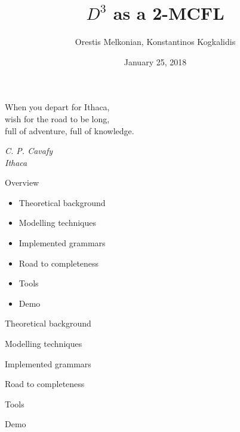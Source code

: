 \documentclass{beamer}
\title{$D^3$ as a 2-MCFL}
\subtitle{}
\author{Orestis Melkonian, Konstantinos Kogkalidis}
\date{January 25, 2018}
\institute{Universiteit Utrecht}
\begin{document}
	\maketitle	
	\begin{frame}{}
		\epigraph
			{When you depart for Ithaca,\\wish for the road to be long,\\full of adventure, full of knowledge.}
			{\textit{C. P. Cavafy\\ Ithaca}}
	\end{frame}
	
	\begin{frame}{Overview}
    \begin{itemize}
      \item Theoretical background
      \item Modelling techniques
      \item Implemented grammars
      \item Road to completeness
      \item Tools
      \item Demo
    \end{itemize}
	\end{frame}
  	
  	\begin{frame}{Theoretical background}
  	\end{frame}
  	\begin{frame}{Modelling techniques}
  	\end{frame}
  	\begin{frame}{Implemented grammars}
  	\end{frame}
  	\begin{frame}{Road to completeness}
  	\end{frame}
  	\begin{frame}{Tools}
  	\end{frame}
  	\begin{frame}{Demo}
  	\end{frame}
\end{document}
